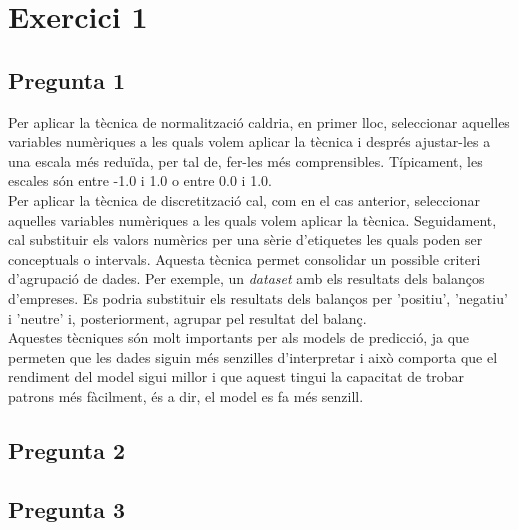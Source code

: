 \documentclass[a4paper,12pt]{report}
\begin{document}
\thispagestyle{empty}
	\begin{titlepage}
		\maketitle
		\thispagestyle{empty}
	\end{titlepage}
	\cleardoublepage
	\newpage

\thispagestyle{empty}
\tableofcontents
\thispagestyle{empty}
\newpage
{}
\section*{Exercici 1}
\subsection*{Pregunta 1}
Per aplicar la tècnica de normalització caldria, en primer lloc, seleccionar aquelles variables numèriques a les quals volem aplicar la tècnica i després ajustar-les a una escala més reduïda, per tal de, fer-les més comprensibles. Típicament, les escales són entre -1.0 i 1.0 o entre 0.0 i 1.0.\\
Per aplicar la tècnica de discretització cal, com en el cas anterior, seleccionar aquelles variables numèriques a les quals volem aplicar la tècnica. Seguidament, cal substituir els valors numèrics per una sèrie d'etiquetes les quals poden ser conceptuals o intervals. Aquesta tècnica permet consolidar un possible criteri d'agrupació de dades. Per exemple, un \textit{dataset} amb els resultats dels balanços d'empreses. Es podria substituir els resultats dels balanços per 'positiu', 'negatiu' i 'neutre' i, posteriorment, agrupar pel resultat del balanç.\\
Aquestes tècniques són molt importants per als models de predicció, ja que permeten que les dades siguin més senzilles d'interpretar i això comporta que el rendiment del model sigui millor i que aquest tingui la capacitat de trobar patrons més fàcilment, és a dir, el model es fa més senzill.
\subsection*{Pregunta 2}

\subsection*{Pregunta 3}
\end{document}
